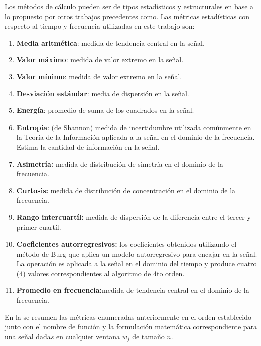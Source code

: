 Los métodos de cálculo pueden ser de tipos estadísticos y estructurales
\cite{LaraLabrador2013} en base a lo propuesto por otros trabajos
precedentes como\cite{Yang2009,Bao2004}. Las métricas estadísticas
con respecto al tiempo y frecuencia utilizadas en este trabajo son:
\begin{enumerate}
\item \textbf{Media aritmética}: medida de tendencia central en la señal.
\item \textbf{Valor máximo}: medida de valor extremo en la señal.
\item \textbf{Valor mínimo}: medida de valor extremo en la señal.
\item \textbf{Desviación estándar}: media de dispersión en la señal.
\item \textbf{Energía}: promedio de suma de los cuadrados en la señal.
\item \textbf{Entropía}: (de Shannon) medida de incertidumbre utilizada
comúnmente en la Teoría de la Información aplicada a la señal en el
dominio de la frecuencia. Estima la cantidad de información en la
señal.
\item \textbf{Asimetría:} medida de distribución de simetría en el dominio
de la frecuencia.
\item \textbf{Curtosis:} medida de distribución de concentración en el dominio
de la frecuencia.
\item \textbf{Rango intercuartíl:} medida de dispersión de la diferencia
entre el tercer y primer cuartíl.
\item \textbf{Coeficientes autorregresivos:} los coeficientes obtenidos
utilizando el método de Burg que aplica un modelo autorregresivo para
encajar en la señal. La operación es aplicada a la señal en el dominio
del tiempo y produce cuatro (4) valores correspondientes al algoritmo
de 4to orden.
\item \textbf{Promedio en frecuencia:}medida de tendencia central en el
dominio de la frecuencia.
\end{enumerate}
En la  se resumen las métricas enumeradas anteriormente
en el orden establecido junto con el nombre de función y la formulación
matemática correspondiente para una señal dada$s$ en cualquier ventana
$w_{j}$ de tamaño $n$.

